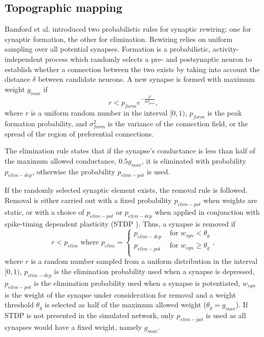 \documentclass[sigconf]{acmart}
\begin{document}
\subsection{Topographic mapping}

Bamford et al. \cite{bamford2010synaptic} introduced two probabilistic rules for synaptic rewiring: one for synaptic formation, the other for elimination.
Rewiring relies on uniform sampling over all potential synapses. 
Formation is a probabilistic, activity-independent
process which randomly selects a pre- and postsynaptic neuron to establish whether a connection between the two exists by taking into account the distance $\delta$ between candidate neurons. 
A new synapse is formed with maximum weight $g_{max}$ if
%
\begin{equation} \label{eq:formation_rule}
r<p_{form}e^{-\frac{\delta^2}{2\sigma^2_{form}}},
\end{equation}
%
where $r$ is a uniform random number in the interval $[0, 1)$, $p_{form}$ is the peak formation probability, and $\sigma^2_{form}$ is the variance of the connection field, or the spread of the region of preferential connections.

The elimination rule states that if the synapse's conductance is less than half of the maximum allowed conductance, $0.5g_{max}$, it is eliminated with probability $p_{elim-dep}$, otherwise the probability $p_{elim-pot}$ is used.

If the randomly selected synaptic element exists, the removal rule is followed.
Removal is either carried out with a fixed probability $p_{elim-pot}$ when weights are static, or with a choice of $p_{elim-pot}$  or $p_{elim-dep}$ when applied in conjunction with spike-timing dependent plasticity (STDP \cite{Song2000}). 
Thus, a synapse is removed if
%
\begin{equation} \label{eq:elimination_rule}
r<p_{elim} \text{ where } p_{elim} = 
    \begin{cases}
        p_{elim-dep} & \text{ for }   w_{syn}  < \theta_g \\
        p_{elim-pot} & \text{ for }   w_{syn}  \geq \theta_g \\
    \end{cases},
\end{equation}
%
where $r$ is a random number sampled from a uniform distribution in the interval $[0, 1)$, $p_{elim-dep}$ is the elimination probability used when a synapse is depressed, $p_{elim-pot}$ is the elimination probability used when a synapse is potentiated, $w_{syn}$ is the weight of the synapse under consideration for removal and a weight threshold $\theta_g$ is selected as half of the maximum allowed weight ($ \theta_g = g_{max}$). 
If STDP is not presented in the simulated network, only $p_{elim-pot}$ is used as all synapses would have a fixed weight, namely $g_{max}$.
\end{document}
